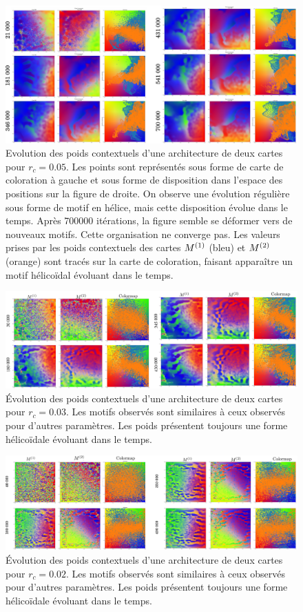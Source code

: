 \documentclass[../main]{subfiles}
\begin{document}
\begin{figure}
	\includegraphics[width=\textwidth]{sphere_rc005_evol_landscape}
	\caption{Evolution des poids contextuels d'une architecture de deux cartes pour $r_c =0.05$. Les points sont représentés sous forme de carte de coloration à gauche et sous forme de disposition dans l'espace des positions sur la figure de droite. On observe une évolution régulière sous forme de motif en hélice, mais cette disposition évolue dans le temps. Après 700000 itérations, la figure semble se déformer vers de nouveaux motifs. Cette organisation ne converge pas. Les valeurs prises par les poids contextuels des cartes $M^{({1})}$ (bleu) et $M^{({2})}$ (orange) sont tracés sur la carte de coloration, faisant apparaître un motif hélicoïdal évoluant dans le temps.
	\label{fig:rc_005}}
\end{figure}


\begin{figure}
	\includegraphics[width=\textwidth]{wc_rc003_evol.pdf}
	\caption{\'Evolution des poids contextuels d'une architecture de deux cartes pour $r_c =0.03$. Les motifs observés sont similaires à ceux observés pour d'autres paramètres. Les poids présentent toujours une forme hélicoïdale évoluant dans le temps.\label{fig:rc_003}}
\end{figure}

\begin{figure}
	\includegraphics[width=\textwidth]{wc_rc002_evol.pdf}
	\caption{\'Evolution des poids contextuels d'une architecture de deux cartes pour $r_c =0.02$. Les motifs observés sont similaires à ceux observés pour d'autres paramètres. Les poids présentent toujours une forme hélicoïdale évoluant dans le temps. \label{fig:rc_002}}
\end{figure}
\end{document}
